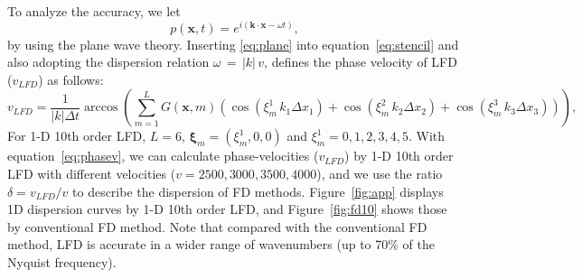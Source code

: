 To analyze the accuracy, we let
\begin{equation}
  \label{eq:plane}
  p(\mathbf{x},t) = e^{i(\mathbf{k}\cdot\mathbf{x}-\omega t)}, 
\end{equation}
by using the plane wave theory.
Inserting \ref{eq:plane} into equation~\ref{eq:stencil} and also adopting the dispersion relation $\omega\,=\,|k|\,v$, 
defines the phase velocity of LFD ($v_{LFD}$) as follows:
\begin{equation}
  \label{eq:phasev}
  v_{LFD}=\frac{1}{|k|\Delta t} \arccos(\sum\limits_{m=1}^L G(\mathbf{x},m) (\cos(\xi_m^1\,k_1\Delta x_1)+\cos(\xi_m^2\,k_2\Delta x_2)+\cos(\xi_m^3\,k_3\Delta x_3))) , 
\end{equation}
For 1-D 10th order LFD, $L=6$, $\mathbf{\xi}_m=(\xi_m^1,0,0)$ and $\xi_m^1={0,1,2,3,4,5}$.
With equation~\ref{eq:phasev}, 
we can calculate phase-velocities ($v_{LFD}$) by 1-D 10th order LFD with different velocities ($v=2500,3000,3500,4000$),
and we use the ratio $\delta=v_{LFD}/v$ to describe the dispersion of FD methods.
Figure~\ref{fig:app} displays 1D dispersion curves by 1-D 10th order LFD,     
and Figure~\ref{fig:fd10} shows those by conventional FD method. 
Note that compared with the conventional FD method, LFD is accurate in
a wider range of wavenumbers (up to 70\% of the Nyquist frequency). 


